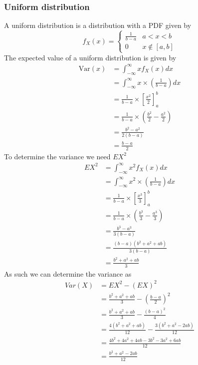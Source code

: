 \subsubsection{Uniform distribution}
A uniform distribution is a distribution with a PDF given by
\[
    f_{X}(x)=\begin{cases}\frac{1}{b-a} & a<x<b \\ 0 & x\notin[a,b]\end{cases}
\]
The expected value of a uniform distribution is given by
\begin{align*}
    \text{Var}(x)&=\int_{-\infty}^{\infty}xf_{X}(x)dx \\
             &=\int_{-\infty}^{\infty}x\times\left(\frac{1}{b-a}\right)dx \\
             &=\frac{1}{b-a}\times\left[\frac{x^{2}}{2}\right]_{a}^{b} \\
             &=\frac{1}{b-a}\times\left(\frac{b^{2}}{2}-\frac{a^{2}}{2}\right) \\
             &=\frac{b^{2}-a^{2}}{2(b-a)} \\
             &=\frac{b-a}{2}
\end{align*}
To determine the variance we need $EX^{2}$
\begin{align*}
    EX^{2}&=\int_{-\infty}^{\infty}x^{2}f_{X}(x)dx \\
       &=\int_{-\infty}^{\infty}x^{2}\times\left(\frac{1}{b-a}\right)dx \\
       &=\frac{1}{b-a}\times\left[\frac{x^{3}}{3}\right]_{a}^{b} \\
       &=\frac{1}{b-a}\times\left(\frac{b^{3}}{3}-\frac{a^{3}}{3}\right) \\
       &=\frac{b^{3}-a^{3}}{3(b-a)} \\
       &=\frac{(b-a)(b^{2}+a^{2}+ab)}{3(b-a)} \\
       &=\frac{b^{2}+a^{2}+ab}{3}
\end{align*}
As such we can determine the variance as
\begin{align*}
    Var(X)&=EX^{2}-(EX)^{2} \\
          &=\frac{b^{2}+a^{2}+ab}{3}-\left(\frac{b-a}{2}\right)^{2} \\
          &=\frac{b^{2}+a^{2}+ab}{3}-\frac{(b-a)^{2}}{4} \\
          &=\frac{4(b^{2}+a^{2}+ab)}{12}-\frac{3(b^{2}+a^{2}-2ab)}{12} \\
          &=\frac{4b^{2}+4a^{2}+4ab-3b^{2}-3a^{2}+6ab}{12} \\
          &=\frac{b^{2}+a^{2}-2ab}{12}
\end{align*}
